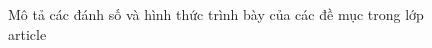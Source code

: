 \documentclass[12pt,a4paper]{article}
\begin{document}
\begin{itemize}
\begin{itemize}
                \begin{figure}[h]
                  \begin{center}
                    \vspace{-1cm}
                    \hspace*{-1.5cm}
                  \end{center}
                  \caption{Mô tả các đánh số và hình thức trình bày của các đề mục trong lớp article}\label{Ex:danhso-noidung-2}
                  \vspace{-1cm}
                \end{figure}
        \end{itemize}
\end{itemize}
\end{document}
